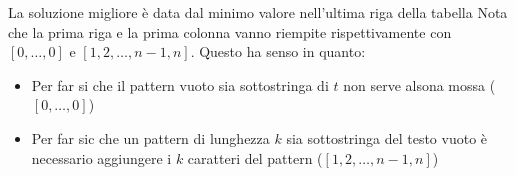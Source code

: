 \begin{center}
\end{center}

La soluzione migliore è data dal minimo valore nell'ultima riga della tabella
\vskip3mm
Nota che la prima riga e la prima colonna vanno riempite rispettivamente con $ \left[0,\ldots , 0\right] $ e $ \left[1,2,\ldots , n-1, n\right] $. Questo ha senso in quanto:
\begin{itemize}
	\item Per far si che il pattern vuoto sia sottostringa di $ t $ non serve alsona mossa ($ \left[0,\ldots ,0\right] $)
	\item Per far sic che un pattern di lunghezza $ k $ sia sottostringa del testo vuoto è necessario aggiungere i $ k $ caratteri del pattern ($ \left[1,2,\ldots , n-1, n\right] $)
\end{itemize}
